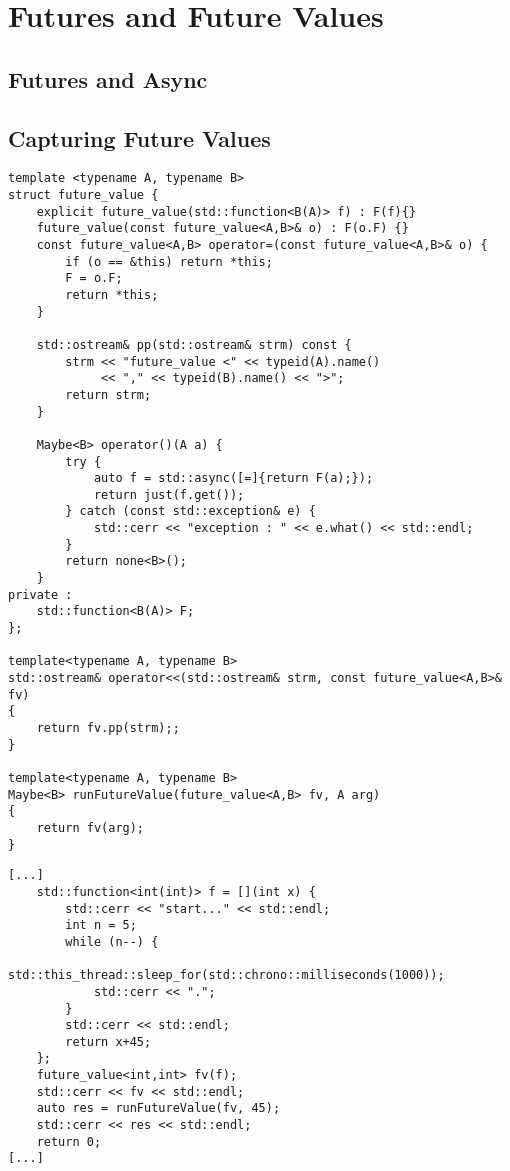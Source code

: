 \documentclass[12pt,fleqn]{article}
\begin{document}
\section{Futures and Future Values}
%
%

%
%
\subsection{Futures and Async}
%

\subsection{Capturing Future Values}
%
%
%
\begin{minipage}{\linewidth}
\begin{lstlisting}[caption=Future value type class, label=fv]
template <typename A, typename B>
struct future_value {
	explicit future_value(std::function<B(A)> f) : F(f){}
	future_value(const future_value<A,B>& o) : F(o.F) {}
	const future_value<A,B> operator=(const future_value<A,B>& o) {
		if (o == &this) return *this;
		F = o.F;
		return *this;
	}

	std::ostream& pp(std::ostream& strm) const {
		strm << "future_value <" << typeid(A).name() 
			 << "," << typeid(B).name() << ">";
		return strm;
	}

	Maybe<B> operator()(A a) {
		try {
			auto f = std::async([=]{return F(a);});
			return just(f.get());
		} catch (const std::exception& e) {
			std::cerr << "exception : " << e.what() << std::endl;
		}
		return none<B>();
	}
private :
	std::function<B(A)> F;
};

template<typename A, typename B>
std::ostream& operator<<(std::ostream& strm, const future_value<A,B>& fv) 
{
	return fv.pp(strm);;
}

template<typename A, typename B>
Maybe<B> runFutureValue(future_value<A,B> fv, A arg)
{
	return fv(arg);
}

\end{lstlisting}
\end{minipage}
%
%
%


%
%
\begin{minipage}{\linewidth}
\begin{lstlisting}[caption=Example of the use of the future value type class,label=fvexamp]
[...]
	std::function<int(int)> f = [](int x) { 
		std::cerr << "start..." << std::endl;
		int n = 5;
		while (n--) {
			std::this_thread::sleep_for(std::chrono::milliseconds(1000));
			std::cerr << ".";
		}
		std::cerr << std::endl;
		return x+45;
	};
	future_value<int,int> fv(f);
	std::cerr << fv << std::endl;
	auto res = runFutureValue(fv, 45);
	std::cerr << res << std::endl;
	return 0;
[...]
\end{lstlisting}
\end{minipage}
%
%
%
\end{document}
